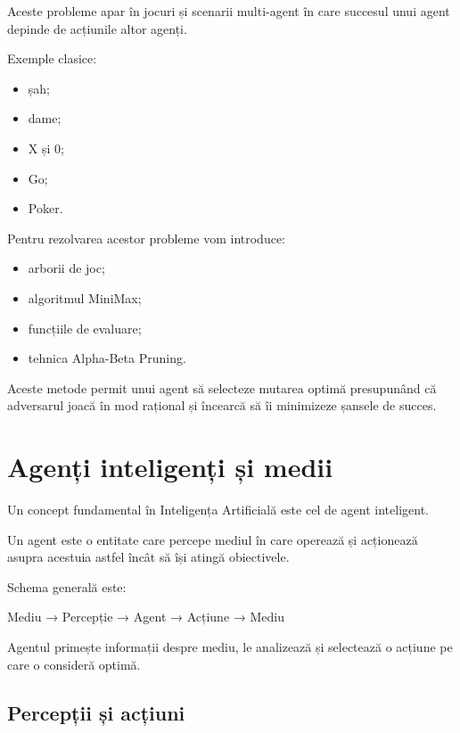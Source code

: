 \documentclass[12pt,a4paper]{article}
\begin{document}
Aceste probleme apar în jocuri și scenarii multi-agent în care succesul unui agent depinde de acțiunile altor agenți.

Exemple clasice:

\begin{itemize}
\item șah;
\item dame;
\item X și 0;
\item Go;
\item Poker.
\end{itemize}

Pentru rezolvarea acestor probleme vom introduce:

\begin{itemize}
\item arborii de joc;
\item algoritmul MiniMax;
\item funcțiile de evaluare;
\item tehnica Alpha-Beta Pruning.
\end{itemize}

Aceste metode permit unui agent să selecteze mutarea optimă presupunând că adversarul joacă în mod rațional și încearcă să îi minimizeze șansele de succes.












\section{Agenți inteligenți și medii}

Un concept fundamental în Inteligența Artificială este cel de agent inteligent.

Un agent este o entitate care percepe mediul în care operează și acționează asupra acestuia astfel încât să își atingă obiectivele.

Schema generală este:

\begin{center}
Mediu → Percepție → Agent → Acțiune → Mediu
\end{center}

Agentul primește informații despre mediu, le analizează și selectează o acțiune pe care o consideră optimă.

\subsection{Percepții și acțiuni}
\end{document}
